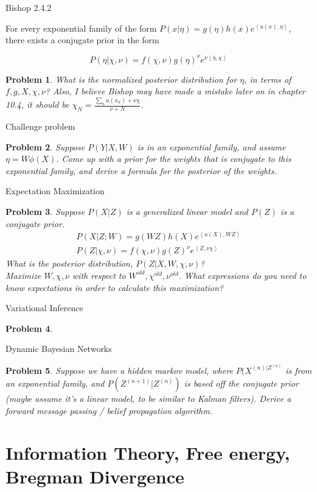 \documentclass[a4paper]{article}
\newtheorem{problem}{Problem}[section]
\begin{document}
Bishop 2.4.2

For every exponential family of the form $P( x \vert \eta) = g(\eta) h(x) e^{ \left< u(x), \eta \right>}$, there exists a conjugate prior in the form

\begin{equation}
  P( \eta \vert \chi, \nu) = f( \chi, \nu) g(\eta)^\nu e^{ \nu \left< \eta, \chi \right> }
  \label{conjugate prior}
\end{equation}

\begin{problem}
  What is the normalized posterior distribution for $\eta$, in terms of $f,g,X,\chi,\nu$?  Also, I believe Bishop may have made a mistake later on in chapter 10.4, it should be $\chi_N = \frac{ \sum_n u(x_n) + \nu \chi}{\nu + N }$.
\end{problem}

Challenge problem
\begin{problem}
  Suppose $P(Y \vert X, W)$ is in an exponential family, and assume $\eta = W \phi(X)$.  Come up with a prior for the weights that is conjugate to this exponential family, and derive a formula for the posterior of the weights.
\end{problem}

Expectation Maximization
\begin{problem}
  Suppose $P(X \vert Z)$ is a generalized linear model and $P(Z)$ is a conjugate prior.
\begin{equation}
  \begin{split}
    P( X \vert Z; W) = g( W Z ) h(X) e^{\left< u(X), W Z \right> } \\
    P( Z \vert \chi, \nu) = f(\chi,\nu) g(Z)^\nu e^{\left< Z, \nu \chi \right> }
  \end{split}
  \label{}
\end{equation}
What is the posterior distribution, $P(Z \vert X, W, \chi, \nu)$?  \\
Maximize $W,\chi,\nu$ with respect to $W^{old},\chi^{old},\nu^{old}$.  What expressions do you need to know expectations in order to calculate this maximization?
\end{problem}

Variational Inference
\begin{problem}

\end{problem}

Dynamic Bayesian Networks

\begin{problem}
  Suppose we have a hidden markov model, where $P(X^{(n) \vert Z^{(n)}}$ is from an exponential family, and $P( Z^{(n+1)} \vert Z^{(n)} )$ is based off the conjugate prior (maybe assume it's a linear model, to be similar to Kalman filters).  Derive a forward message passing / belief propagation algorithm.
\end{problem}


\section{Information Theory, Free energy, Bregman Divergence}
\end{document}
